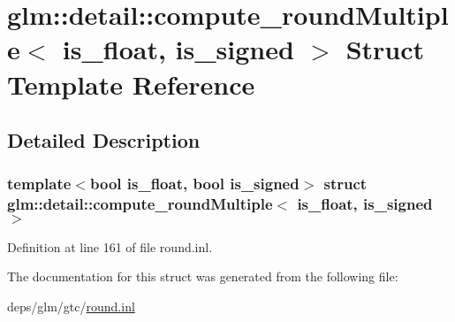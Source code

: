 \hypertarget{structglm_1_1detail_1_1compute__roundMultiple}{}\section{glm\+:\+:detail\+:\+:compute\+\_\+round\+Multiple$<$ is\+\_\+float, is\+\_\+signed $>$ Struct Template Reference}
\label{structglm_1_1detail_1_1compute__roundMultiple}


\subsection{Detailed Description}
\subsubsection*{template$<$bool is\+\_\+float, bool is\+\_\+signed$>$\newline
struct glm\+::detail\+::compute\+\_\+round\+Multiple$<$ is\+\_\+float, is\+\_\+signed $>$}



Definition at line 161 of file round.\+inl.



The documentation for this struct was generated from the following file\+:\begin{DoxyCompactItemize}
\item 
deps/glm/gtc/\hyperlink{round_8inl}{round.\+inl}\end{DoxyCompactItemize}

